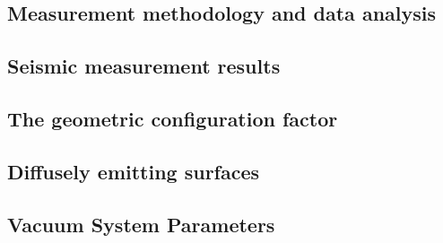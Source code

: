 \subsection{Measurement methodology and data analysis}\label{Site_MeasMeth}

\subsection{Seismic measurement results}
\label{sec:Seismic-Mesurement-appendix}

\subsection{The geometric configuration factor}
\label{sec:geometric-appendix}

\subsection{Diffusely emitting surfaces}
\label{sec:diffuse-appendix}

\subsection{Vacuum System Parameters}
\label{sec:infra_table}

